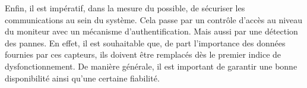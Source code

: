 Enfin, il est impératif, dans la mesure du possible, de sécuriser les communications au sein du système. Cela passe par un
contrôle d'accès au niveau du moniteur avec un mécanisme d'authentification. Mais aussi par une détection des pannes. En effet, il
est souhaitable que, de part l'importance des données fournies par ces capteurs, ils doivent être remplacés dès le premier indice
de dysfonctionnement. De manière générale, il est important de garantir une bonne disponibilité ainsi qu'une certaine fiabilité.

\begin{table}[h!]
    \centering
    \caption{Utilisation des services du middleware par les différents modules}
    \label{tab:monitor_middleware}
\end{table}

